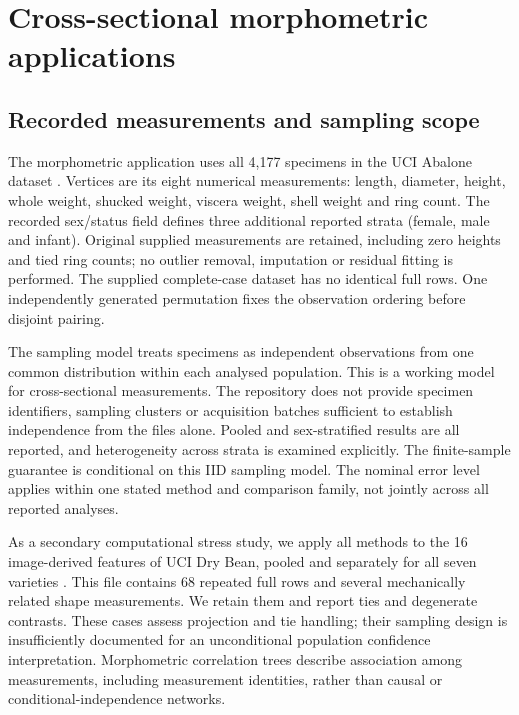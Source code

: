 


\section{Cross-sectional morphometric applications}\label{sec:crosssection}
\subsection{Recorded measurements and sampling scope}
The morphometric application uses all 4,177 specimens in the UCI Abalone dataset \citep{abalone1994}. Vertices are its eight numerical measurements: length, diameter, height, whole weight, shucked weight, viscera weight, shell weight and ring count. The recorded sex/status field defines three additional reported strata (female, male and infant). Original supplied measurements are retained, including zero heights and tied ring counts; no outlier removal, imputation or residual fitting is performed. The supplied complete-case dataset has no identical full rows. One independently generated permutation fixes the observation ordering before disjoint pairing.

The sampling model treats specimens as independent observations from one common distribution within each analysed population. This is a working model for cross-sectional measurements. The repository does not provide specimen identifiers, sampling clusters or acquisition batches sufficient to establish independence from the files alone. Pooled and sex-stratified results are all reported, and heterogeneity across strata is examined explicitly. The finite-sample guarantee is conditional on this IID sampling model. The nominal error level applies within one stated method and comparison family, not jointly across all reported analyses.

As a secondary computational stress study, we apply all methods to the 16 image-derived features of UCI Dry Bean, pooled and separately for all seven varieties \citep{drybean2020}. This file contains 68 repeated full rows and several mechanically related shape measurements. We retain them and report ties and degenerate contrasts. These cases assess projection and tie handling; their sampling design is insufficiently documented for an unconditional population confidence interpretation. Morphometric correlation trees describe association among measurements, including measurement identities, rather than causal or conditional-independence networks.

